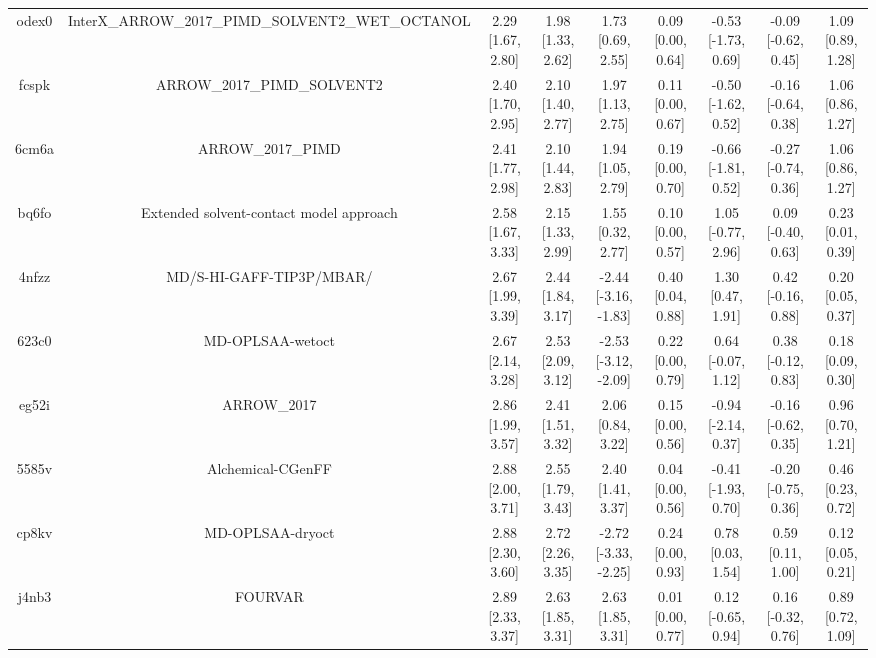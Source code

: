 \documentclass{article}
\begin{document}
\begin{center}
\begin{longtable}{|ccccccccc|}
 odex0 &  InterX\_ARROW\_2017\_PIMD\_SOLVENT2\_WET\_OCTANOL &  2.29 [1.67, 2.80] &  1.98 [1.33, 2.62] &     1.73 [0.69, 2.55] &  0.09 [0.00, 0.64] &  -0.53 [-1.73, 0.69] &  -0.09 [-0.62, 0.45] &     1.09 [0.89, 1.28] \\
 fcspk &                        ARROW\_2017\_PIMD\_SOLVENT2 &  2.40 [1.70, 2.95] &  2.10 [1.40, 2.77] &     1.97 [1.13, 2.75] &  0.11 [0.00, 0.67] &  -0.50 [-1.62, 0.52] &  -0.16 [-0.64, 0.38] &     1.06 [0.86, 1.27] \\
 6cm6a &                                  ARROW\_2017\_PIMD &  2.41 [1.77, 2.98] &  2.10 [1.44, 2.83] &     1.94 [1.05, 2.79] &  0.19 [0.00, 0.70] &  -0.66 [-1.81, 0.52] &  -0.27 [-0.74, 0.36] &     1.06 [0.86, 1.27] \\
 bq6fo &            Extended solvent-contact model approach &  2.58 [1.67, 3.33] &  2.15 [1.33, 2.99] &     1.55 [0.32, 2.77] &  0.10 [0.00, 0.57] &   1.05 [-0.77, 2.96] &   0.09 [-0.40, 0.63] &     0.23 [0.01, 0.39] \\
 4nfzz &                           MD/S-HI-GAFF-TIP3P/MBAR/ &  2.67 [1.99, 3.39] &  2.44 [1.84, 3.17] &  -2.44 [-3.16, -1.83] &  0.40 [0.04, 0.88] &    1.30 [0.47, 1.91] &   0.42 [-0.16, 0.88] &     0.20 [0.05, 0.37] \\
 623c0 &                                   MD-OPLSAA-wetoct &  2.67 [2.14, 3.28] &  2.53 [2.09, 3.12] &  -2.53 [-3.12, -2.09] &  0.22 [0.00, 0.79] &   0.64 [-0.07, 1.12] &   0.38 [-0.12, 0.83] &     0.18 [0.09, 0.30] \\
 eg52i &                                        ARROW\_2017 &  2.86 [1.99, 3.57] &  2.41 [1.51, 3.32] &     2.06 [0.84, 3.22] &  0.15 [0.00, 0.56] &  -0.94 [-2.14, 0.37] &  -0.16 [-0.62, 0.35] &     0.96 [0.70, 1.21] \\
 5585v &                                  Alchemical-CGenFF &  2.88 [2.00, 3.71] &  2.55 [1.79, 3.43] &     2.40 [1.41, 3.37] &  0.04 [0.00, 0.56] &  -0.41 [-1.93, 0.70] &  -0.20 [-0.75, 0.36] &     0.46 [0.23, 0.72] \\
 cp8kv &                                   MD-OPLSAA-dryoct &  2.88 [2.30, 3.60] &  2.72 [2.26, 3.35] &  -2.72 [-3.33, -2.25] &  0.24 [0.00, 0.93] &    0.78 [0.03, 1.54] &    0.59 [0.11, 1.00] &     0.12 [0.05, 0.21] \\
 j4nb3 &                                            FOURVAR &  2.89 [2.33, 3.37] &  2.63 [1.85, 3.31] &     2.63 [1.85, 3.31] &  0.01 [0.00, 0.77] &   0.12 [-0.65, 0.94] &   0.16 [-0.32, 0.76] &     0.89 [0.72, 1.09] \\

\end{longtable}
\end{center}
\end{document}
